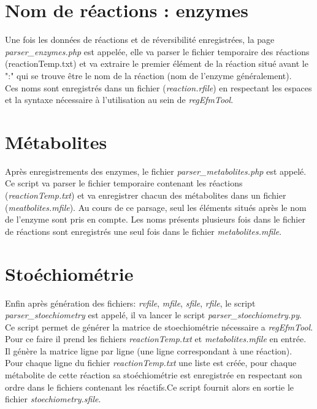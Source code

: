 \section{Nom de réactions : enzymes}
Une fois les données de réactions et de réversibilité enregistrées, la page \emph{parser\_enzymes.php} est appelée, elle va parser le fichier temporaire des réactions (reactionTemp.txt) et va extraire le premier élément de la réaction situé avant le ":" qui se trouve être le nom de la réaction (nom de l'enzyme généralement).\\
Ces noms sont enregistrés dans un fichier (\emph{reaction.rfile}) en respectant les espaces et la syntaxe nécessaire à l'utilisation au sein de \emph{regEfmTool}.

\section{Métabolites}
Après enregistrements des enzymes, le fichier \emph{parser\_metabolites.php} est appelé. Ce script va parser le fichier temporaire contenant les réactions (\emph{reactionTemp.txt}) et va enregistrer chacun des métabolites dans un fichier (\emph{meatbolites.mfile}). Au cours de ce parsage, seul les éléments situés après le nom de l'enzyme sont pris en compte. Les noms présents plusieurs fois dans le fichier de réactions sont enregistrés une seul fois dans le fichier \emph{metabolites.mfile}.

\section{Stoéchiométrie}
Enfin après génération des fichiers: \emph{rvfile}, \emph{mfile}, \emph{sfile}, \emph{rfile}, le script \emph{parser\_stoechiometry} est appelé, il va lancer le script \emph{parser\_stoechiometry.py}. Ce script permet de générer la matrice de stoechiométrie nécessaire a \emph{regEfmTool}. Pour ce faire il prend les fichiers \emph{reactionTemp.txt} et \emph{metabolites.mfile} en entrée. Il génère la matrice ligne par ligne (une ligne correspondant à une réaction). \\
Pour chaque ligne du fichier \emph{reactionTemp.txt} une liste est créée, pour chaque métabolite de cette réaction sa stoéchiométrie est enregistrée en respectant son ordre dans le fichiers contenant les réactifs.Ce script fournit alors en sortie le fichier \emph{stoechiometry.sfile}.


